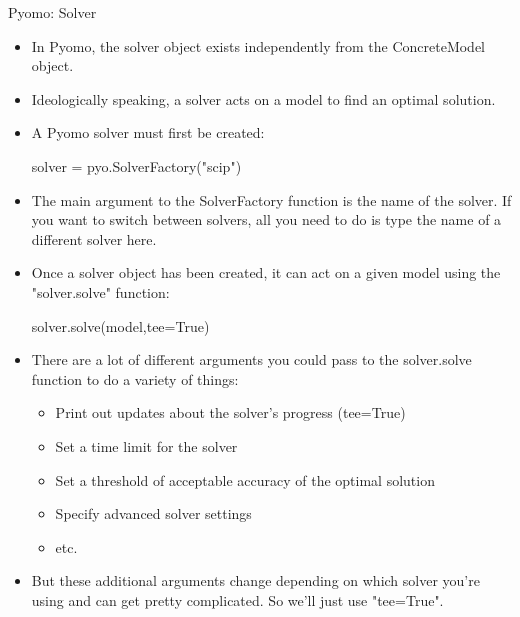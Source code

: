 \documentclass[10pt, aspectratio=169]{beamer}
\begin{document}
\begin{frame}{Pyomo: Solver}
    \begin{itemize}
        \item In Pyomo, the solver object exists independently from the ConcreteModel object.
        \item Ideologically speaking, a solver acts on a model to find an optimal solution.
        \item A Pyomo solver must first be created:
        
        \hspace{0.25cm} solver = pyo.SolverFactory("scip")

        \item The main argument to the SolverFactory function is the name of the solver. If you want to switch between solvers, all you need to do is type the name of a different solver here.
        \item Once a solver object has been created, it can act on a given model using the "solver.solve" function:
        
        \hspace{0.25cm} solver.solve(model,tee=True)

        \item There are a lot of different arguments you could pass to the solver.solve function to do a variety of things:
        \begin{itemize}
            \item Print out updates about the solver's progress (tee=True)
            \item Set a time limit for the solver
            \item Set a threshold of acceptable accuracy of the optimal solution
            \item Specify advanced solver settings
            \item etc.
        \end{itemize}
        \item But these additional arguments change depending on which solver you're using and can get pretty complicated. So we'll just use "tee=True".
    \end{itemize}
\end{frame}
\end{document}
